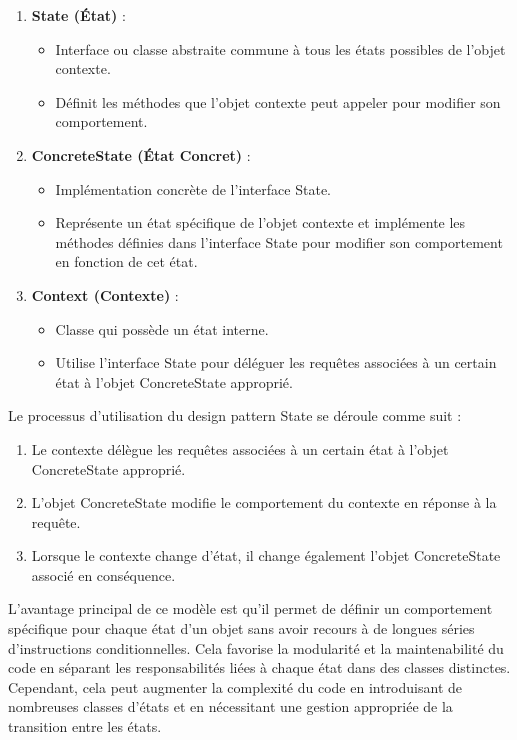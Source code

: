 \documentclass[french]{article}
\begin{document}
\begin{enumerate}
    \item \textbf{State (État)} :
    \begin{itemize}
        \item Interface ou classe abstraite commune à tous les états possibles de l'objet contexte.
        \item Définit les méthodes que l'objet contexte peut appeler pour modifier son comportement.
    \end{itemize}
    
    \item \textbf{ConcreteState (État Concret)} :
    \begin{itemize}
        \item Implémentation concrète de l'interface State.
        \item Représente un état spécifique de l'objet contexte et implémente les méthodes définies dans l'interface State pour modifier son comportement en fonction de cet état.
    \end{itemize}
    
    \item \textbf{Context (Contexte)} :
    \begin{itemize}
        \item Classe qui possède un état interne.
        \item Utilise l'interface State pour déléguer les requêtes associées à un certain état à l'objet ConcreteState approprié.
    \end{itemize}
\end{enumerate}

Le processus d'utilisation du design pattern State se déroule comme suit :

\begin{enumerate}
    \item Le contexte délègue les requêtes associées à un certain état à l'objet ConcreteState approprié.
    \item L'objet ConcreteState modifie le comportement du contexte en réponse à la requête.
    \item Lorsque le contexte change d'état, il change également l'objet ConcreteState associé en conséquence.
\end{enumerate}

L'avantage principal de ce modèle est qu'il permet de définir un comportement spécifique pour chaque état d'un objet sans avoir recours à de longues séries d'instructions conditionnelles. Cela favorise la modularité et la maintenabilité du code en séparant les responsabilités liées à chaque état dans des classes distinctes. Cependant, cela peut augmenter la complexité du code en introduisant de nombreuses classes d'états et en nécessitant une gestion appropriée de la transition entre les états.
\end{document}
